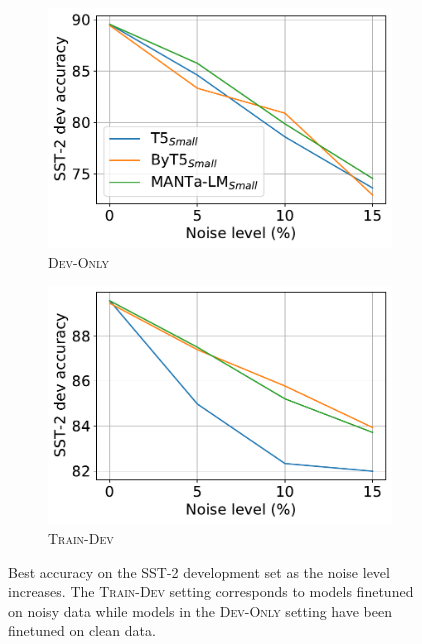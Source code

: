\begin{figure}[t]
    \centering
    \begin{subfigure}[b]{0.48\columnwidth}
         \includegraphics[width=\linewidth]{sources/part_2/manta/images/noise_curve_dev.pdf}
         \caption{\textsc{Dev-Only}}
    \end{subfigure}
    \begin{subfigure}[b]{0.48\columnwidth}
         \includegraphics[width=\linewidth]{sources/part_2/manta/images/noise_curve.pdf}
         \caption{\textsc{Train-Dev}}
    \end{subfigure}
    \caption{Best accuracy on the SST-2 development set as the noise level increases. The \textsc{Train-Dev} setting corresponds to models finetuned on noisy data while models in the \textsc{Dev-Only} setting have been finetuned on clean data.}
    \label{fig:noisy_sst2}
\end{figure}

